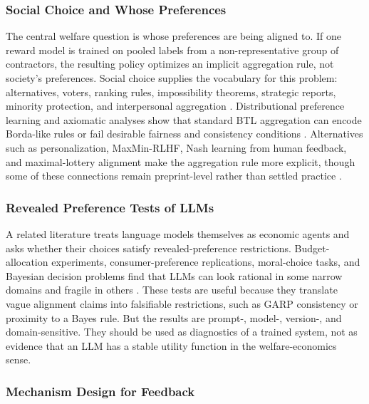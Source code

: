 \subsubsection{Social Choice and Whose Preferences}

The central welfare question is whose preferences are being aligned to. If one reward model is trained on pooled labels from a non-representative group of contractors, the resulting policy optimizes an implicit aggregation rule, not society's preferences. Social choice supplies the vocabulary for this problem: alternatives, voters, ranking rules, impossibility theorems, strategic reports, minority protection, and interpersonal aggregation \citep{conitzer2024socialchoice,mishra2023socialchoice}. Distributional preference learning and axiomatic analyses show that standard BTL aggregation can encode Borda-like rules or fail desirable fairness and consistency conditions \citep{siththaranjan2024distributional,ge2024axioms}. Alternatives such as personalization, MaxMin-RLHF, Nash learning from human feedback, and maximal-lottery alignment make the aggregation rule more explicit, though some of these connections remain preprint-level rather than settled practice \citep{park2024heterogeneous,chakraborty2024maxmin,munos2023nash,maurarivero2025maximal}.

\subsubsection{Revealed Preference Tests of LLMs}

A related literature treats language models themselves as economic agents and asks whether their choices satisfy revealed-preference restrictions. Budget-allocation experiments, consumer-preference replications, moral-choice tasks, and Bayesian decision problems find that LLMs can look rational in some narrow domains and fragile in others \citep{chen2023rationalitygpt,golisingh2024preferences,seror2024moral,murawatrawat2025bayesian}. These tests are useful because they translate vague alignment claims into falsifiable restrictions, such as GARP consistency or proximity to a Bayes rule. But the results are prompt-, model-, version-, and domain-sensitive. They should be used as diagnostics of a trained system, not as evidence that an LLM has a stable utility function in the welfare-economics sense.

\subsubsection{Mechanism Design for Feedback}

